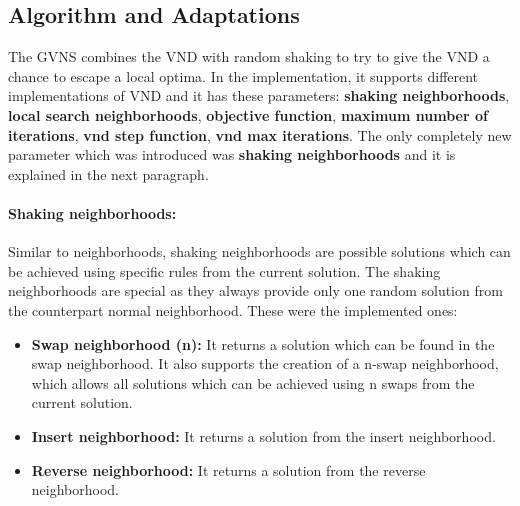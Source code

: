 \documentclass{article}
\begin{document}
\subsection*{Algorithm and Adaptations}
The GVNS combines the VND with random shaking to try to give the VND a chance to escape a local optima. In the implementation, it supports different implementations of VND and it has these parameters:  \textbf{shaking neighborhoods},  \textbf{local search neighborhoods},  \textbf{objective function},  \textbf{maximum number of iterations},  \textbf{vnd step function},  \textbf{vnd max iterations}. The only completely new parameter which was introduced was \textbf{shaking neighborhoods} and it is explained in the next paragraph.

\paragraph{Shaking neighborhoods:}
Similar to neighborhoods, shaking neighborhoods are possible solutions which can be achieved using specific rules from the current solution. The shaking neighborhoods are special as they always provide only one random solution from the counterpart normal neighborhood. These were the implemented ones:
\begin{itemize}
	\item \textbf{Swap neighborhood (n):} It returns a solution which can be found in the swap neighborhood. It also supports the creation of a n-swap neighborhood, which allows all solutions which can be achieved using n swaps from the current solution.
	\item \textbf{Insert neighborhood:} It returns a solution from the insert neighborhood.
	\item \textbf{Reverse neighborhood:} It returns a solution from the reverse neighborhood.
\end{itemize}
\end{document}
